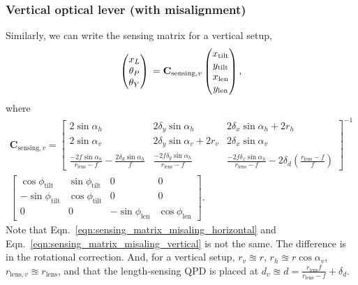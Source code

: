 \subsubsection{Vertical optical lever (with misalignment)}
Similarly, we can write the sensing matrix for a vertical setup,
\begin{equation}
	\begin{pmatrix}
		x_L\\
		\theta_P\\
		\theta_Y
	\end{pmatrix}\\
	=
	\mathbf{C}_{\mathrm{sensing},v}
	\begin{pmatrix}
		x_\mathrm{tilt}\\
		y_\mathrm{tilt}\\
		x_\mathrm{len}\\
		y_\mathrm{len}
	\end{pmatrix},
\end{equation}
where
\begin{multline}
	\mathbf{C}_{\mathrm{sensing},v}=
	\begin{bmatrix}
		2\sin\alpha_h & 2\delta_y\sin\alpha_h & 2\delta_x\sin\alpha_h + 2r_h\\
		2\sin\alpha_v & 2\delta_y\sin\alpha_v + 2r_v & 2\delta_x\sin\alpha_v\\
		\frac{-2f\sin\alpha_h}{r_\mathrm{lens}-f} - \frac{2\delta_d\sin\alpha_h}{f} & \frac{-2f\delta_y\sin\alpha_h}{r_\mathrm{lens}-f} & \frac{-2f\delta_x\sin\alpha_h}{r_\mathrm{lens}-f} - 2\delta_d\left(\frac{r_\mathrm{lens}-f}{f}\right)
	\end{bmatrix}^{-1}\\
	\begin{bmatrix}
		\cos\phi_\mathrm{tilt} & \sin\phi_\mathrm{tilt} & 0 & 0\\
		-\sin\phi_\mathrm{tilt} & \cos\phi_\mathrm{tilt} & 0 & 0\\
		0 & 0 & -\sin\phi_\mathrm{len} & \cos\phi_\mathrm{len}
	\end{bmatrix}.
	\label{eqn:sensing_matrix_misaling_vertical}
\end{multline}
Note that Eqn.~\eqref{eqn:sensing_matrix_misaling_horizontal} and Eqn.~\eqref{eqn:sensing_matrix_misaling_vertical} is not the same.
The difference is in the rotational correction.
And, for a vertical setup, $r_v\approxeq r$, $r_h\approxeq r\cos\alpha_v$, $r_{\mathrm{lens},v}\approxeq r_\mathrm{lens}$, and that the length-sensing QPD is placed at $d_v \approxeq d = \frac{r_\mathrm{lens}f}{r_\mathrm{lens}-f}+\delta_d$.

